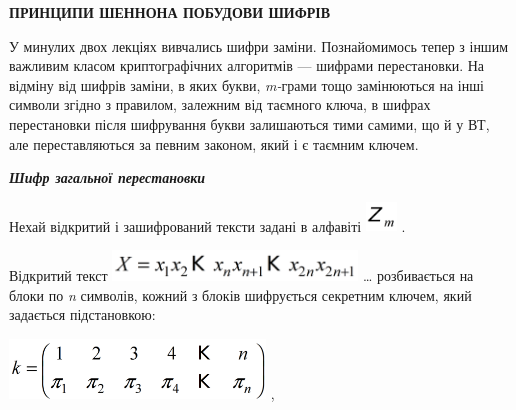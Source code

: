 {\centering\bfseries
ПРИНЦИПИ  ШЕННОНА  ПОБУДОВИ  ШИФРІВ
\par}


\bigskip


\bigskip

У минулих двох лекціях вивчались шифри заміни. Познайомимось тепер з іншим
важливим класом криптографічних алгоритмів --- шифрами перестановки. На відміну
від шифрів заміни, в яких букви, \textit{m}\textit{{}-}грами тощо замінюються
на інші символи згідно з правилом, залежним від таємного ключа, в шифрах
перестановки після шифрування букви залишаються тими самими, що й у ВТ, але
переставляються за певним законом, який і є таємним ключем. 


\bigskip

{\centering\bfseries\itshape
Шифр загальної  перестановки
\par}


\bigskip

Нехай відкритий і зашифрований тексти задані в алфавіті 
\includegraphics[width=0.3228in,height=0.3098in]{crypt-img/crypt-img55.png} .

Відкритий текст 
\includegraphics[width=2.5638in,height=0.3228in]{crypt-img/crypt-img56.png} …
розбивається на блоки по \textit{n }символів, кожний з блоків шифрується
секретним ключем, який задається підстановкою:

{\centering
 \includegraphics[width=2.678in,height=0.6244in]{crypt-img/crypt-img57.png} ,
\par}

